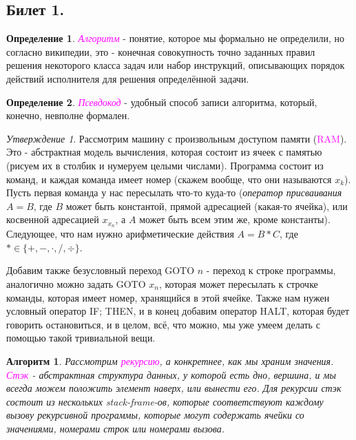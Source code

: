 \documentclass[a4paper]{article}
\theoremstyle{indented}
\newtheorem{alg}{Алгоритм}
\theoremstyle{definition}
\newtheorem{defn}{Определение}
\theoremstyle{remark}
\newtheorem{stat}{Утверждение}
\begin{document}
\subsection{Билет 1.}

\begin{defn}
    \textcolor{magenta}{\hypertarget{d-1}{\textit{Алгоритм}}} - понятие, которое мы формально не определили, но согласно википедии, это - конечная совокупность точно заданных правил решения некоторого класса задач или набор инструкций, описывающих порядок действий исполнителя для решения определённой задачи. 
\end{defn}

\begin{defn}
    \textcolor{magenta}{\hypertarget{d-2}{\textit{Псевдокод}}} - удобный способ записи алгоритма, который, конечно, невполне формален.
\end{defn}

\begin{stat}
    Рассмотрим машину с произвольным доступом памяти (\textcolor{magenta}{RAM}). Это - абстрактная модель вычисления, которая состоит из ячеек с памятью (рисуем их в столбик и нумеруем целыми числами). Программа состоит из команд, и каждая команда имеет номер (скажем вообще, что они называются $x_k$). Пусть первая команда у нас пересылать что-то куда-то (\textit{оператор присваивания} $A=B$, где $B$ может быть константой, прямой адресацией (какая-то ячейка), или косвенной адресацией $x_{x_n}$, а $A$ может быть всем этим же, кроме константы). Следующее, что нам нужно арифметические действия $A=B*C$, где $*\in\{+, -, \cdot, /, \div\}$. \ 

    Добавим также безусловный переход GOTO $n$ - переход к строке программы, аналогично можно задать GOTO $x_n$, которая может пересылать к строчке команды, которая имеет номер, хранящийся в этой ячейке. Также нам нужен условный оператор {IF; THEN}, и в конец добавим оператор HALT, которая будет говорить остановиться, и в целом, всё, что можно, мы уже умеем делать с помощью такой тривиальной вещи. \ 
\end{stat}

\begin{alg}
    Рассмотрим \textcolor{magenta}{\hypertarget{d-3}{\textit{рекурсию}}}, а конкретнее, как мы храним значения. \textcolor{magenta}{\hypertarget{d-4}{\textit{Стэк}}} - абстрактная структура данных, у которой есть дно, вершина, и мы всегда можем положить элемент наверх, или вынести его. Для рекурсии стэк состоит из нескольких stack-frame-ов, которые соответствуют каждому вызову рекурсивной программы, которые могут содержать ячейки со значениями, номерами строк или номерами вызова.
\end{alg}
\end{document}
